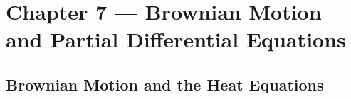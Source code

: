 \section{Chapter 7 --- Brownian Motion and Partial Differential Equations}

\subsection{Brownian Motion and the Heat Equations}